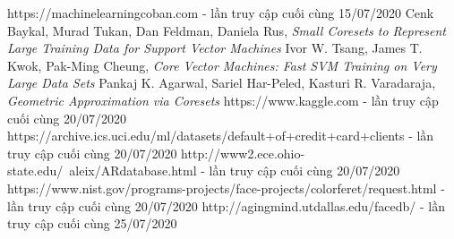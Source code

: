 \documentclass[a4paper, 12pt, oneside]{report}
\begin{document}
\begin{thebibliography}{80}
https://machinelearningcoban.com - lần truy cập cuối cùng 15/07/2020
Cenk Baykal, Murad Tukan, Dan Feldman, Daniela Rus, \textit{Small Coresets to Represent Large Training Data for Support Vector Machines} 
Ivor W. Tsang, James T. Kwok, Pak-Ming Cheung, \textit{Core Vector Machines: Fast SVM Training on Very Large Data Sets}
Pankaj K. Agarwal, Sariel Har-Peled, Kasturi R. Varadaraja, \textit{Geometric Approximation via Coresets}
https://www.kaggle.com - lần truy cập cuối cùng 20/07/2020
https://archive.ics.uci.edu/ml/datasets/default+of+credit+card+clients - lần truy cập cuối cùng 20/07/2020
http://www2.ece.ohio-state.edu/~aleix/ARdatabase.html - lần truy cập cuối cùng 20/07/2020
https://www.nist.gov/programs-projects/face-projects/colorferet/request.html - lần truy cập cuối cùng 20/07/2020
http://agingmind.utdallas.edu/facedb/ - lần truy cập cuối cùng 25/07/2020

\end{thebibliography}
\end{document}

